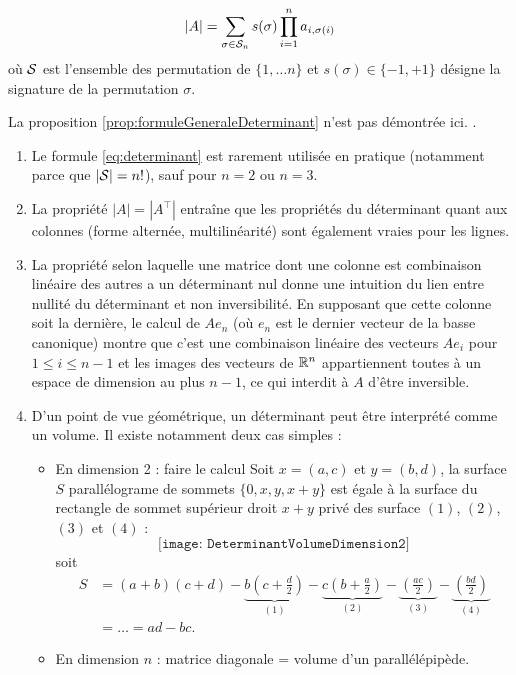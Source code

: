 \begin{proposition} \label{prop:formuleGeneraleDeterminant}
  \begin{equation} \label{eq:determinant}
    |A| = \sum_{\sigma \in \mathcal{S}_n} s(\sigma) \prod_{i=1}^n a_{i, \sigma(i)} 
    \end{equation}
    où $\mathcal{S}$ est l'ensemble des permutation de $\{1, \dots n\}$ et $s(\sigma) \in \{-1, +1\}$ désigne la signature de la permutation $\sigma$. 
\end{proposition}

La proposition \ref{prop:formuleGeneraleDeterminant} n'est pas démontrée ici. \eproof.

\remarks 
\begin{enumerate}
 \item Le formule \eqref{eq:determinant} est rarement utilisée en pratique (notamment parce que $|\mathcal{S}| = n!$), sauf pour $n=2$ ou $n=3$.
 \item La propriété $|A| = |A^\top|$ entraîne que les propriétés du déterminant quant aux colonnes (forme alternée, multilinéarité) sont également vraies pour les lignes. 
 \item La propriété selon laquelle une matrice dont une colonne est combinaison linéaire des autres a un déterminant nul donne une intuition du lien entre nullité du déterminant et non inversibilité. En supposant que cette colonne soit la dernière, le calcul de $A e_n$ (où $e_n$ est le dernier vecteur de la basse canonique) montre que c'est une combinaison linéaire des vecteurs $A e_i$ pour $1 \leq i \leq n-1$ et les images des vecteurs de $\mathbb{R}^n$ appartiennent toutes à un espace de dimension au plus $n-1$, ce qui interdit à $A$ d'être inversible.
  \item D'un point de vue géométrique, un déterminant peut être interprété comme un volume. Il existe notamment deux cas simples :
  \begin{itemize}
  \item En dimension 2 : faire le calcul
    Soit $x = (a, c)$ et $y = (b, d)$, la surface $S$ parallélograme de sommets $\{0, x, y, x+y\}$ est égale à la surface du rectangle de sommet supérieur droit $x+y$ privé des surface $(1)$, $(2)$, $(3)$ et $(4)$ : 
    $$
    \texttt{[image: DeterminantVolumeDimension2]}
    $$
    soit
    \begin{align*}
      S 
      & = (a+b)(c+d) 
      - \underset{(1)}{\underbrace{b\left(c + \frac{d}2\right)}} 
      - \underset{(2)}{\underbrace{c\left(b + \frac{a}2\right)}} 
      - \underset{(3)}{\underbrace{\left(\frac{ac}2\right)}} 
      - \underset{(4)}{\underbrace{\left(\frac{bd}2\right)}} \\
      & = \dots = ad - bc.
    \end{align*}
  \item En dimension $n$ : matrice diagonale = volume d'un parallélépipède.
  \end{itemize}
\end{enumerate}

